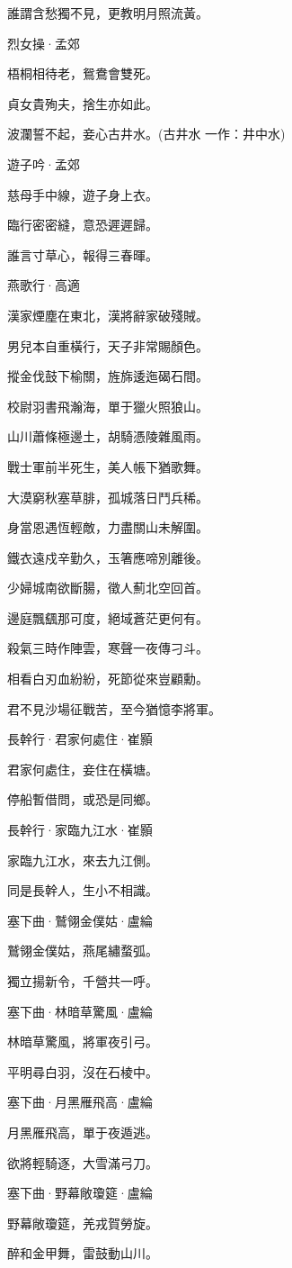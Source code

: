 \documentclass[12pt,a4paper]{ctexbook}
\begin{document}
誰謂含愁獨不見，更教明月照流黃。\par
烈女操·孟郊\par
梧桐相待老，鴛鴦會雙死。\par
貞女貴殉夫，捨生亦如此。\par
波瀾誓不起，妾心古井水。(古井水 一作：井中水)\par
遊子吟·孟郊\par
慈母手中線，遊子身上衣。\par
臨行密密縫，意恐遲遲歸。\par
誰言寸草心，報得三春暉。\par
燕歌行·高適\par
漢家煙塵在東北，漢將辭家破殘賊。\par
男兒本自重橫行，天子非常賜顏色。\par
摐金伐鼓下榆關，旌旆逶迤碣石間。\par
校尉羽書飛瀚海，單于獵火照狼山。\par
山川蕭條極邊土，胡騎憑陵雜風雨。\par
戰士軍前半死生，美人帳下猶歌舞。\par
大漠窮秋塞草腓，孤城落日鬥兵稀。\par
身當恩遇恆輕敵，力盡關山未解圍。\par
鐵衣遠戍辛勤久，玉箸應啼別離後。\par
少婦城南欲斷腸，徵人薊北空回首。\par
邊庭飄颻那可度，絕域蒼茫更何有。\par
殺氣三時作陣雲，寒聲一夜傳刁斗。\par
相看白刃血紛紛，死節從來豈顧勳。\par
君不見沙場征戰苦，至今猶憶李將軍。\par
長幹行·君家何處住·崔顥\par
君家何處住，妾住在橫塘。\par
停船暫借問，或恐是同鄉。\par
長幹行·家臨九江水·崔顥\par
家臨九江水，來去九江側。\par
同是長幹人，生小不相識。\par
塞下曲·鷲翎金僕姑·盧綸\par
鷲翎金僕姑，燕尾繡蝥弧。\par
獨立揚新令，千營共一呼。\par
塞下曲·林暗草驚風·盧綸\par
林暗草驚風，將軍夜引弓。\par
平明尋白羽，沒在石棱中。\par
塞下曲·月黑雁飛高·盧綸\par
月黑雁飛高，單于夜遁逃。\par
欲將輕騎逐，大雪滿弓刀。\par
塞下曲·野幕敞瓊筵·盧綸\par
野幕敞瓊筵，羌戎賀勞旋。\par
醉和金甲舞，雷鼓動山川。\par
\end{document}
